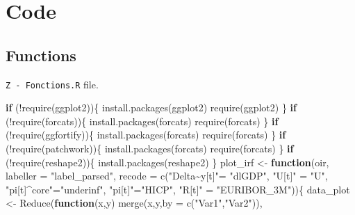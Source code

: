 \documentclass[
  10pt,
]{article}
\newenvironment{Shaded}{\begin{snugshade}}{\end{snugshade}}
\newcommand{\AttributeTok}[1]{\textcolor[rgb]{0.77,0.63,0.00}{#1}}
\newcommand{\ControlFlowTok}[1]{\textcolor[rgb]{0.13,0.29,0.53}{\textbf{#1}}}
\newcommand{\FunctionTok}[1]{\textcolor[rgb]{0.00,0.00,0.00}{#1}}
\newcommand{\NormalTok}[1]{#1}
\newcommand{\OtherTok}[1]{\textcolor[rgb]{0.56,0.35,0.01}{#1}}
\newcommand{\SpecialCharTok}[1]{\textcolor[rgb]{0.00,0.00,0.00}{#1}}
\newcommand{\StringTok}[1]{\textcolor[rgb]{0.31,0.60,0.02}{#1}}
\begin{document}
\appendix

\hypertarget{code}{%
\section{Code}\label{code}}

\hypertarget{functions}{%
\subsection{Functions}\label{functions}}

\texttt{Z\ -\ Fonctions.R} file.

\begin{Shaded}
\begin{Highlighting}[]
\ControlFlowTok{if}\NormalTok{ (}\SpecialCharTok{!}\FunctionTok{require}\NormalTok{(ggplot2))\{}
    \FunctionTok{install.packages}\NormalTok{(ggplot2)}
    \FunctionTok{require}\NormalTok{(ggplot2)}
\NormalTok{\}}
\ControlFlowTok{if}\NormalTok{ (}\SpecialCharTok{!}\FunctionTok{require}\NormalTok{(forcats))\{}
    \FunctionTok{install.packages}\NormalTok{(forcats)}
    \FunctionTok{require}\NormalTok{(forcats)}
\NormalTok{\}}
\ControlFlowTok{if}\NormalTok{ (}\SpecialCharTok{!}\FunctionTok{require}\NormalTok{(ggfortify))\{}
    \FunctionTok{install.packages}\NormalTok{(forcats)}
    \FunctionTok{require}\NormalTok{(forcats)}
\NormalTok{\}}
\ControlFlowTok{if}\NormalTok{ (}\SpecialCharTok{!}\FunctionTok{require}\NormalTok{(patchwork))\{}
    \FunctionTok{install.packages}\NormalTok{(forcats)}
    \FunctionTok{require}\NormalTok{(forcats)}
\NormalTok{\}}
\ControlFlowTok{if}\NormalTok{ (}\SpecialCharTok{!}\FunctionTok{require}\NormalTok{(reshape2))\{}
    \FunctionTok{install.packages}\NormalTok{(reshape2)}
\NormalTok{\}}
\NormalTok{plot\_irf }\OtherTok{\textless{}{-}} \ControlFlowTok{function}\NormalTok{(oir,}
                     \AttributeTok{labeller =} \StringTok{"label\_parsed"}\NormalTok{,}
                     \AttributeTok{recode =} \FunctionTok{c}\NormalTok{(}\StringTok{"Delta\textasciitilde{}y[t]"}\OtherTok{=} \StringTok{"dlGDP"}\NormalTok{,}
                                \StringTok{"U[t]"} \OtherTok{=} \StringTok{"U"}\NormalTok{,}
                                \StringTok{"pi[t]\^{}core"}\OtherTok{=}\StringTok{"underinf"}\NormalTok{,}
                                \StringTok{"pi[t]"}\OtherTok{=}\StringTok{"HICP"}\NormalTok{,}
                                \StringTok{"R[t]"} \OtherTok{=} \StringTok{"EURIBOR\_3M"}\NormalTok{))\{}
\NormalTok{    data\_plot }\OtherTok{\textless{}{-}} \FunctionTok{Reduce}\NormalTok{(}\ControlFlowTok{function}\NormalTok{(x,y) }\FunctionTok{merge}\NormalTok{(x,y,}\AttributeTok{by =} \FunctionTok{c}\NormalTok{(}\StringTok{"Var1"}\NormalTok{,}\StringTok{"Var2"}\NormalTok{)),}

\end{Highlighting}
\end{Shaded}
\end{document}
